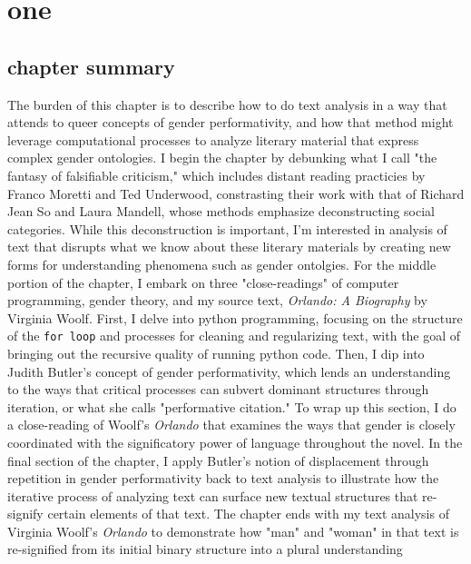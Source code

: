 \documentclass[11pt]{article}
\author{Filipa  Calado}
\date{\today}
\title{}
\begin{document}
\tableofcontents

\section{one}
\label{sec:org85061e9}

\subsection{chapter summary}
\label{sec:orgaf9352c}
The burden of this chapter is to describe how to do text analysis in a
way that attends to queer concepts of gender performativity, and how
that method might leverage computational processes to analyze literary
material that express complex gender ontologies. I begin the chapter
by debunking what I call "the fantasy of falsifiable criticism," which
includes distant reading practicies by Franco Moretti and Ted
Underwood, constrasting their work with that of Richard Jean So and
Laura Mandell, whose methods emphasize deconstructing social
categories. While this deconstruction is important, I'm interested in
analysis of text that disrupts what we know about these literary
materials by creating new forms for understanding phenomena such as
gender ontolgies. For the middle portion of the chapter, I embark on
three "close-readings" of computer programming, gender theory, and my
source text, \emph{Orlando: A Biography} by Virginia Woolf. First, I delve
into python programming, focusing on the structure of the \texttt{for loop}
and processes for cleaning and regularizing text, with the goal of
bringing out the recursive quality of running python code. Then, I dip
into Judith Butler's concept of gender performativity, which lends an
understanding to the ways that critical processes can subvert dominant
structures through iteration, or what she calls "performative
citation." To wrap up this section, I do a close-reading of Woolf's
\emph{Orlando} that examines the ways that gender is closely coordinated
with the significatory power of language throughout the novel. In the
final section of the chapter, I apply Butler's notion of displacement
through repetition in gender performativity back to text analysis to
illustrate how the iterative process of analyzing text can surface new
textual structures that re-signify certain elements of that text. The
chapter ends with my text analysis of Virginia Woolf's \emph{Orlando} to
demonstrate how "man" and "woman" in that text is re-signified from
its initial binary structure into a plural understanding 
\end{document}
